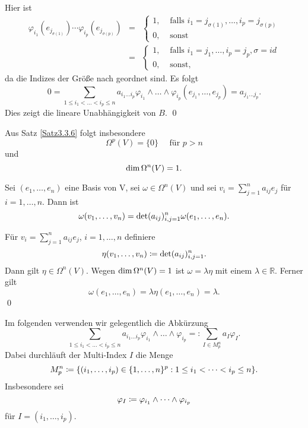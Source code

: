\documentclass[a4paper,twoside,DIV15,BCOR12mm]{scrbook}
\begin{document}
Hier ist
\begin{eqnarray*}
\varphi_{i_1}(e_{j_{\sigma(1)}}) \cdots 
\varphi_{i_p}(e_{j_{\sigma(p)}}) & = & \left\{ \begin{array}{ll} 1, & 
\mbox{ falls } i_{1} = j_{\sigma(1)},\dots,i_{p} = j_{\sigma(p)} \\
0, & \mbox{ sonst} \end{array} \right. \\
& = & \left\{ \begin{array}{ll} 1, & \mbox{ falls } i_{1} = 
j_{1},\dots,i_{p} = j_{p}, \sigma = id \\ 0, & \mbox{ sonst,} 
\end{array} \right.
\end{eqnarray*}
da die Indizes der Größe nach geordnet sind. Es folgt
\[ 0 = \sum_{1 \le i_{1} < \dots < i_{p} \le n} a_{i_{1}\dots i_{p}} 
\varphi_{i_1} \wedge \dots \wedge 
\varphi_{i_p}(e_{j_1},\dots,e_{j_p}) = a_{j_{1}\dots j_{p}}. \]
Dies zeigt die lineare Unabhängigkeit von $B$. \qed\\

\bigskip

\noindent
Aus Satz \ref{Satz3.3.6} folgt insbesondere
\[ \Omega^{p}(V) = \{0\} \quad \mbox{ für } p > n \]
und
\[ {\rm dim}\, \Omega^{n}(V) = 1. \]

\bigskip

\begin{satz}\label{Satz3.3.7} {Sei $(e_{1},\dots,e_{n})$ eine Basis 
von V, sei $\omega \in \Omega^{n}(V)$ und sei $v_{i} = 
\sum_{j=1}^{n}a_{ij}e_{j}$ für $i = 1,\dots,n$. Dann ist}
\[ \omega(v_{1},\dots,v_{n}) = {\rm det}(a_{ij})_{i,j=1}^{n} 
\omega(e_{1},\dots,e_{n}). \]
\end{satz}

\bigskip

 Für $v_{i} = \sum_{j=1}^{n} a_{ij}e_{j}$, 
$i = 1,\dots,n$ definiere
\[ \eta(v_{1},\dots,v_{n}) \da  {\rm det} (a_{ij})_{i,j=1}^{n}. \]
Dann gilt $\eta \in \Omega^{n}(V)$. Wegen ${\rm dim}\, \Omega^{n}(V) = 
1$ ist $\omega = \lambda \eta$ mit einem $\lambda \in {\mathbb R}$. 
Ferner gilt
\[ \omega(e_{1},\dots,e_{n}) = \lambda \eta(e_{1},\dots,e_{n}) = 
\lambda.\]  
\qed\\

\bigskip

 Im folgenden verwenden wir gelegentlich 
die Abkürzung
\[ \sum_{1 \le i_{1} < \dots < i_{p} \le n} a_{i_{1}\dots i_{p}} 
\varphi_{i_1} \wedge \dots \wedge \varphi_{i_p} =: \sum_{I \in 
M_{p}^{n}} a_{I} \varphi_{I}. \]
Dabei durchläuft der Multi-Index $I$ die Menge
\[ M_{p}^{n} \da  \{(i_{1},\dots,i_{p}) \in \{1,\dots,n\}^{p}: 1 \le 
i_{1} < \dots < i_{p} \le n\}. \]
Insbesondere sei
\[ \varphi_{I} \da  \varphi_{i_1} \wedge \dots \wedge \varphi_{i_p} \]
für $I = (i_{1},\dots,i_{p})$.
\end{document}
